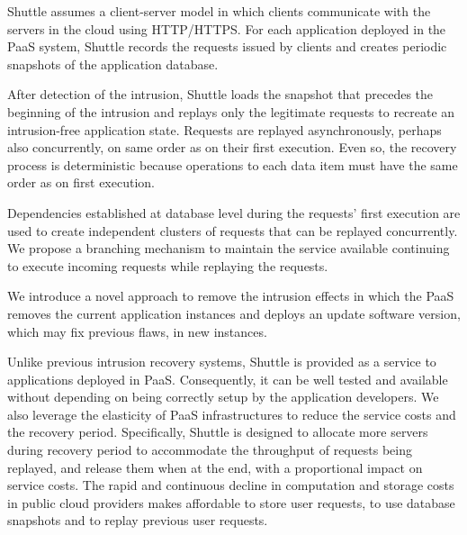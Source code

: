 Shuttle assumes a client-server model in which clients communicate with the servers in the cloud using \ac{HTTP}/\ac{HTTPS}. For each application deployed in the \ac{PaaS} system, Shuttle records the requests issued by clients and creates periodic snapshots of the application database. 

After detection of the intrusion, Shuttle loads the snapshot that precedes the beginning of the intrusion and replays only the legitimate requests to recreate an intrusion-free application state. Requests are replayed asynchronously, perhaps also concurrently, on same order as on their first execution. Even so, the recovery process is deterministic because operations to each data item must have the same order as on first execution. 

Dependencies established at database level during the requests' first execution are used to create independent clusters of requests that can be replayed concurrently. We propose a branching mechanism to maintain the service available continuing to execute incoming requests while replaying the requests. 

We introduce a novel approach to remove the intrusion effects in which the \ac{PaaS} removes the current application instances and deploys an update software version, which may fix previous flaws, in new instances.



Unlike previous intrusion recovery systems, Shuttle is provided as a service to applications deployed in \ac{PaaS}. Consequently, it can be well tested and available without depending on being correctly setup by the application developers. We also leverage the elasticity of \ac{PaaS} infrastructures to reduce the service costs and the recovery period. Specifically, Shuttle is designed to allocate more servers during recovery period to accommodate the throughput of requests being replayed, and release them when at the end, with a proportional impact on service costs. The rapid and continuous decline in computation and storage costs in public cloud providers makes affordable to store user requests, to use database snapshots and to replay previous user requests.

